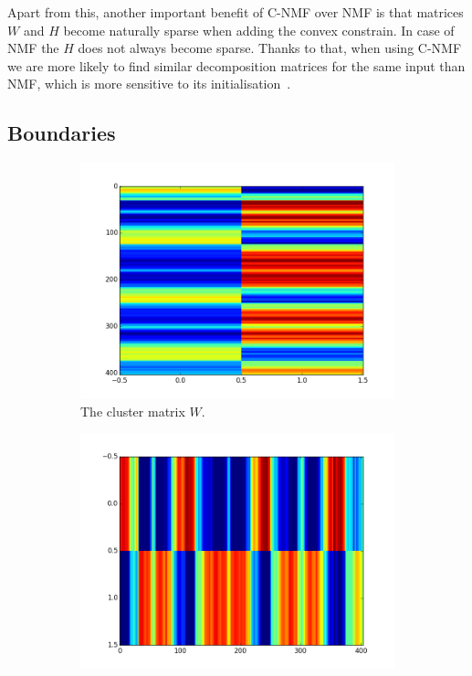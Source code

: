 Apart from this, another important benefit of C-NMF over NMF is that matrices $W$ and $H$ become naturally sparse when adding the convex constrain. In case of NMF the $H$ does not always become sparse. Thanks to that, when using C-NMF we are more likely to find similar decomposition matrices for the same input than NMF, which is more sensitive to its initialisation~\cite{Nieto}. 

\vspace{10pt}


\subsection{Boundaries}

\begin{figure}
        \centering
        \begin{subfigure}[b]{0.47\textwidth}
                \includegraphics[width=\textwidth]{Figures/F}
                \caption{The cluster matrix $W$.}
                \label{fig:Wmatrix}
        \end{subfigure}%
        \begin{subfigure}[b]{0.47\textwidth}
                \includegraphics[width=\textwidth]{Figures/G}

\end{subfigure}
\end{figure}
